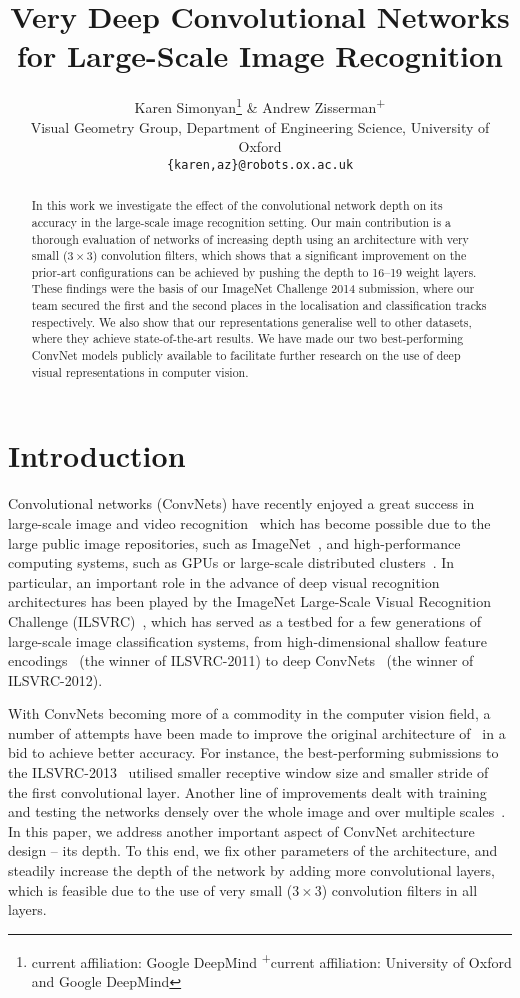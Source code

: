 \documentclass{article} %
\title{Very Deep Convolutional Networks \\ for Large-Scale Image Recognition}
\author{
Karen Simonyan\thanks{current affiliation: Google DeepMind \; \textsuperscript{+}current affiliation: University of Oxford and Google DeepMind} \;
\& Andrew Zisserman\textsuperscript{+} \\
Visual Geometry Group, Department of Engineering Science, University of Oxford\\
\texttt{\{karen,az\}@robots.ox.ac.uk}  
}
\begin{document}
\maketitle

\begin{abstract}
In this work we investigate the effect of the convolutional network depth on its accuracy in the large-scale image recognition setting.
Our main contribution is a thorough evaluation of networks of increasing depth using an architecture with very small ($3 \times 3$) convolution filters,
which shows that a significant improvement on the prior-art configurations can be achieved by pushing the depth to 16--19 weight layers. 
These findings were the basis of our \mbox{ImageNet} \mbox{Challenge} 2014 submission, where our team secured the first and the second places in the localisation and classification tracks
respectively. 
We also show that our representations generalise well to other datasets, where they achieve state-of-the-art results.
We have made our two best-performing ConvNet models publicly available to facilitate further research on the use of deep visual representations in computer vision.
\end{abstract}

\section{Introduction}
Convolutional networks (ConvNets) have recently enjoyed a great success in large-scale image and video recognition~\citep{Krizhevsky12,Zeiler13,Sermanet14,Simonyan14b}
which has become possible due to the large public image repositories, such as ImageNet~\citep{Deng09}, and high-performance computing systems, such as GPUs or large-scale distributed clusters~\citep{Dean12}.
In particular, an important role in the advance of deep visual recognition architectures has been played by the ImageNet Large-Scale Visual Recognition Challenge (ILSVRC)~\citep{Russakovsky14},
which has served as a testbed for a few generations of large-scale image classification systems, from high-dimensional shallow feature encodings~\citep{Perronnin10a} (the winner of ILSVRC-2011)
to deep ConvNets~\citep{Krizhevsky12} (the winner of ILSVRC-2012).

With ConvNets becoming more of a commodity in the computer vision field, a number of attempts have been made to improve the original architecture of~\citet{Krizhevsky12} in a bid to achieve
better accuracy. For instance, the best-performing submissions to the ILSVRC-2013~\citep{Zeiler13,Sermanet14} utilised smaller receptive window size and smaller stride of the first convolutional
layer. Another line of improvements dealt with training and testing the networks densely over the whole image and over multiple scales~\citep{Sermanet14,Howard14}.
In this paper, we address another important aspect of ConvNet architecture design -- its depth. 
To this end, we fix other parameters of the architecture, and steadily increase the depth of the network by adding more convolutional layers, which is feasible due to the use of very small ($3\times 3$) convolution filters in all layers.
\end{document}
